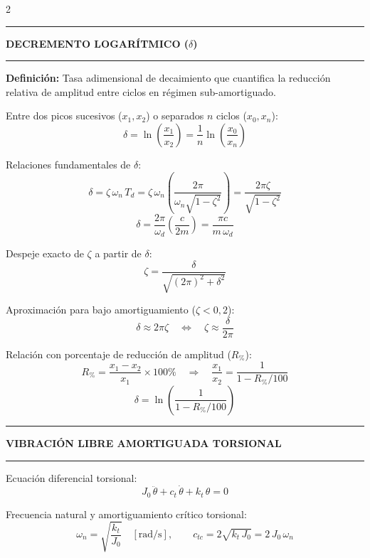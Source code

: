 \documentclass[10pt,a4paper]{article}
\newcommand{\seccion}[1]{%
  \vspace{1.5mm}\hrule\vspace{1mm}%
  \textbf{\footnotesize\MakeUppercase{#1}}\vspace{1mm}\hrule\vspace{1.5mm}}
\begin{document}
\begin{multicols}{2}
\seccion{Decremento logarítmico ($\delta$)}

\textbf{Definición:} Tasa adimensional de decaimiento que cuantifica la reducción relativa de amplitud entre ciclos en régimen sub-amortiguado.

Entre dos picos sucesivos ($x_1, x_2$) o separados $n$ ciclos ($x_0, x_n$):
\begin{equation*}
  \delta = \ln\!\left(\frac{x_1}{x_2}\right) = \frac{1}{n}\ln\!\left(\frac{x_0}{x_n}\right)
\end{equation*}

Relaciones fundamentales de $\delta$:
\begin{equation*}
  \delta = \zeta\,\omega_n\,T_d = \zeta\,\omega_n\left(\frac{2\pi}{\omega_n\sqrt{1-\zeta^2}}\right) = \frac{2\pi\zeta}{\sqrt{1-\zeta^2}}
\end{equation*}
\begin{equation*}
  \delta = \frac{2\pi}{\omega_d}\left(\frac{c}{2m}\right) = \frac{\pi c}{m\,\omega_d}
\end{equation*}

Despeje exacto de $\zeta$ a partir de $\delta$:
\begin{equation*}
  \zeta = \frac{\delta}{\sqrt{(2\pi)^{2} + \delta^{2}}}
\end{equation*}

Aproximación para bajo amortiguamiento ($\zeta < 0{,}2$):
\begin{equation*}
  \delta \approx 2\pi\zeta
  \quad\Longleftrightarrow\quad
  \zeta \approx \frac{\delta}{2\pi}
\end{equation*}

Relación con porcentaje de reducción de amplitud ($R_{\%}$):
\begin{equation*}
  R_{\%} = \frac{x_1 - x_2}{x_1}\times 100\%
  \quad\Longrightarrow\quad
  \frac{x_1}{x_2} = \frac{1}{1 - R_{\%}/100}
\end{equation*}
\begin{equation*}
  \delta = \ln\!\left(\frac{1}{1 - R_{\%}/100}\right)
\end{equation*}

\columnbreak

\seccion{Vibración libre amortiguada torsional}

Ecuación diferencial torsional:
\begin{equation*}
  J_0\,\ddot{\theta} + c_t\,\dot{\theta} + k_t\,\theta = 0
\end{equation*}

Frecuencia natural y amortiguamiento crítico torsional:
\begin{equation*}
  \omega_n = \sqrt{\frac{k_t}{J_0}} \quad [\mathrm{rad/s}],
  \qquad
  c_{tc} = 2\sqrt{k_t\,J_0} = 2\,J_0\,\omega_n
\end{equation*}


\end{multicols}
\end{document}
